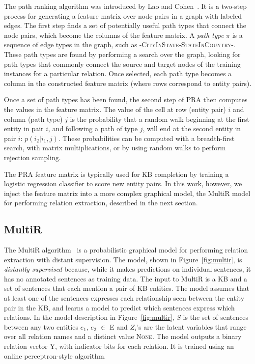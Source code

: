 \documentclass[11pt,a4paper]{article}
\newcommand{\figref}[1]{Figure~\ref{fig:#1}}
\newcommand{\relation}[1]{\textsc{#1}}
\newcommand{\pathtype}{\ensuremath{\pi}}
\begin{document}
The path ranking algorithm was introduced by Lao and
Cohen~.  It is a two-step process for generating a
feature matrix over node pairs in a graph with labeled edges.  The first step
finds a set of potentially useful path types that connect the node pairs, which
become the columns of the feature matrix.  A \emph{path type} \pathtype{} is a
sequence of edge types in the graph, such as
-\relation{CityInState}-\relation{StateInCountry}-.  These path types are found
by performing a search over the graph, looking for path types that commonly
connect the source and target nodes of the training instances for a particular
relation.  Once selected, each path type becomes a column in the constructed
feature matrix (where rows correspond to entity pairs).

Once a set of path types has been found, the second step of PRA then computes
the values in the feature matrix.  The value of the cell at row (entity pair)
$i$ and column (path type) $j$ is the probability that a random walk beginning
at the first entity in pair $i$, and following a path of type $j$, will end at
the second entity in pair $i$: $p(i_2|i_1,j)$.  These probabilities can be
computed with a breadth-first search, with matrix multiplications, or by using
random walks to perform rejection sampling.

The PRA feature matrix is typically used for KB completion by training a
logistic regression classifier to score new entity pairs.  In this work,
however, we inject the feature matrix into a more complex graphical model, the
MultiR model for performing relation extraction, described in the next section.

\subsection{MultiR}

The MultiR algorithm~\cite{hoffmann-2011-distant-supervision} is a
probabilistic graphical model for performing relation extraction with distant
supervision.  The model, shown in \figref{multir}, is \emph{distantly
supervised} because, while it makes predictions on individual sentences, it has
no annotated sentences as training data.  The input to MultiR is a KB and a set
of sentences that each mention a pair of KB entities.  The model assumes that
at least one of the sentences expresses each relationship seen between the
entity pair in the KB, and learns a model to predict which sentences express
which relations.  In the model description in \figref{multir}, $S$ is the set
of sentences between any two entities $e_1$, $e_2$ $\in$ E and $Z_i$'s are the
latent variables that range over all relation names and a distinct value
\relation{None}.  The model outputs a binary relation vector Y, with indicator
bits for each relation.  It is trained using an online perceptron-style
algorithm.
\end{document}
